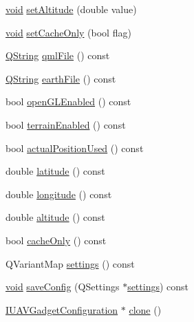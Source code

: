 \begin{DoxyCompactItemize}
\hyperlink{group___u_a_v_objects_plugin_ga444cf2ff3f0ecbe028adce838d373f5c}{void} \hyperlink{class_pfd_qml_gadget_configuration_a46fed011779b0cca97bb57c908516967}{set\-Altitude} (double value)
\item 
\hyperlink{group___u_a_v_objects_plugin_ga444cf2ff3f0ecbe028adce838d373f5c}{void} \hyperlink{class_pfd_qml_gadget_configuration_a2f055da1c3ee5b3dcc50075df05a4c5d}{set\-Cache\-Only} (bool flag)
\item 
\hyperlink{group___u_a_v_objects_plugin_gab9d252f49c333c94a72f97ce3105a32d}{\-Q\-String} \hyperlink{class_pfd_qml_gadget_configuration_a04e7dc7124f00f2af8f09f7d005f4e30}{qml\-File} () const 
\item 
\hyperlink{group___u_a_v_objects_plugin_gab9d252f49c333c94a72f97ce3105a32d}{\-Q\-String} \hyperlink{class_pfd_qml_gadget_configuration_a5d0670c94f98bbf04657d54aa39e348e}{earth\-File} () const 
\item 
bool \hyperlink{class_pfd_qml_gadget_configuration_a289d1ad9e2f94be804e09e7c17f2e460}{open\-G\-L\-Enabled} () const 
\item 
bool \hyperlink{class_pfd_qml_gadget_configuration_ab5f52ff0460be8f9dc6ca588f3e1e148}{terrain\-Enabled} () const 
\item 
bool \hyperlink{class_pfd_qml_gadget_configuration_a30a2419410323d6b394501f4f7be0835}{actual\-Position\-Used} () const 
\item 
double \hyperlink{class_pfd_qml_gadget_configuration_a2d7e79de6505cacd401a08740e234f0f}{latitude} () const 
\item 
double \hyperlink{class_pfd_qml_gadget_configuration_ac2e781e9c9d04b4d7f002c0f4a2bbc45}{longitude} () const 
\item 
double \hyperlink{class_pfd_qml_gadget_configuration_aa125d606609126b8136909a1765e70de}{altitude} () const 
\item 
bool \hyperlink{class_pfd_qml_gadget_configuration_a758aa856a49dd83b0fee84ee839672c0}{cache\-Only} () const 
\item 
\-Q\-Variant\-Map \hyperlink{class_pfd_qml_gadget_configuration_a6b910cf894251ad8049d638b8e389c97}{settings} () const 
\item 
\hyperlink{group___u_a_v_objects_plugin_ga444cf2ff3f0ecbe028adce838d373f5c}{void} \hyperlink{class_pfd_qml_gadget_configuration_a39ab7cc5f5a6acd0276363dfc9552279}{save\-Config} (\-Q\-Settings $\ast$\hyperlink{class_pfd_qml_gadget_configuration_a6b910cf894251ad8049d638b8e389c97}{settings}) const 
\item 
\hyperlink{group___core_plugin_gacdfdf0b1e39b5002472b76b6564ce51f}{\-I\-U\-A\-V\-Gadget\-Configuration} $\ast$ \hyperlink{class_pfd_qml_gadget_configuration_ae59cb9a40d269c0a2eec2c7f0fdaa2cb}{clone} ()
\end{DoxyCompactItemize}



